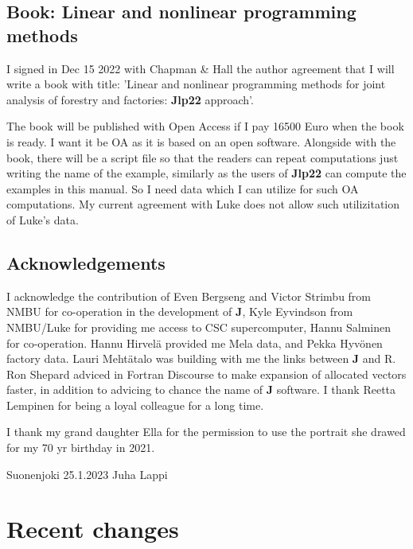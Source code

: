  
\subsection*{Book: Linear and nonlinear programming methods} 
I signed in Dec 15 2022 with Chapman \& Hall the author agreement that I will write 
a book with title: 'Linear and nonlinear programming methods for joint analysis of forestry 
and factories: \textbf{Jlp22} approach'. 
 
The book will be published with Open Access if I pay 16500 Euro when the book is ready. 
I want it be OA as it is based on an open software. Alongside with the book, there will be a script file so that the readers 
can repeat computations just writing the name of the example, similarly as the users 
of \textbf{Jlp22} can compute the examples in this manual. So I need data which I can utilize for such OA 
computations. My current agreement with Luke does not allow such utilizitation of Luke's data. 
 
 
 
 
\subsection*{Acknowledgements} 
 
 
 
I acknowledge the contribution of 
Even Bergseng and Victor Strimbu from NMBU for co-operation in the development of \textbf{J}, Kyle Eyvindson from NMBU/Luke for 
providing me access to CSC supercomputer, Hannu Salminen for co-operation. 
Hannu Hirvel\"a  provided me Mela data, and Pekka Hyv\"onen factory data. 
Lauri Meht\"atalo was building with me the links between \textbf{J} and R. 
Ron Shepard adviced in Fortran Discourse to make expansion of allocated 
vectors faster, in addition to advicing to chance the name of \textbf{J} software. 
I thank Reetta Lempinen for being a loyal colleague for a long time. 
 
 
I thank my grand daughter Ella 
for the permission to use the portrait she drawed for my 70 yr birthday in 2021. 
 
\vspace{0.5cm} 
Suonenjoki 25.1.2023 
\vspace{0.5cm} 
Juha Lappi 
 
\section{Recent changes} 
\label{changes} 
 
